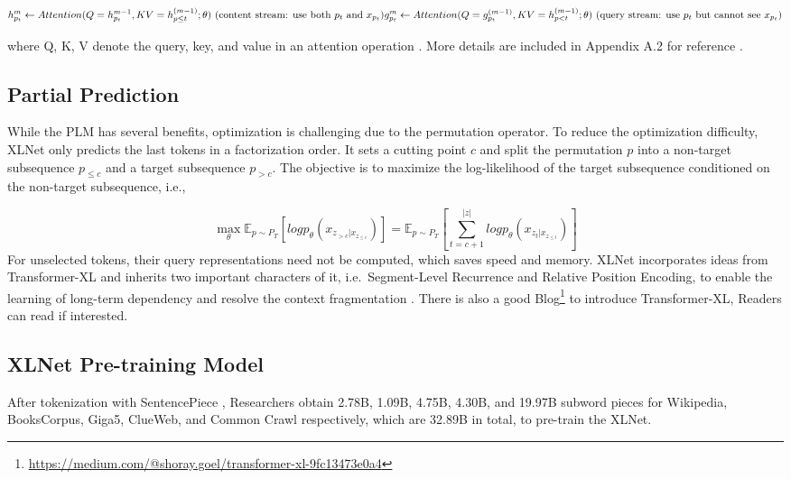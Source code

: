 \documentclass[]{krantz}
\renewcommand{\href}[2]{#2\footnote{\url{#1}}}
\begin{document}
\[
h_{p_t}^{m} \leftarrow Attention (Q=h_{p_t}^{m-1}, KV=h^{(m-1)}_{p \leq t};\theta)
\text{  (content stream: use both $p_t$ and $x_{p_t}$)}
\\
g_{p_t}^{m}\leftarrow Attention (Q=g_{p_t}^{(m-1)}, KV=h^{(m-1)}_{p<t};\theta)
\text{  (query stream: use $p_t$ but cannot see }x_{p_t})
\]

where Q, K, V denote the query, key, and value in an attention operation \citet{vaswani2017attention}.
More details are included in Appendix A.2 for reference \citet{yang2019xlnet}.

\hypertarget{partial-prediction}{%
\subsection{Partial Prediction}\label{partial-prediction}}

While the PLM has several benefits, optimization is challenging due to the permutation operator. To reduce the optimization difficulty, XLNet only predicts the last tokens in a factorization order. It sets a cutting point \(c\) and split the permutation \(p\) into a non-target subsequence \(p_{\leq c}\) and a target subsequence \(p_{>c}\). The objective is to maximize the log-likelihood of the target subsequence conditioned on the non-target subsequence, i.e.,

\begin{equation}
\max_{\theta}   \mathbb{E}_{p\sim P_T} \left[logp_{\theta}(x_{z_{>c}|x_{z_{\leq c}}})\right] =
\mathbb{E}_{p\sim P_T} \left[\sum_{t=c+1}^{|z|} logp_{\theta}(x_{z_t|x_{z_{\leq t}}})\right]
\end{equation}
For unselected tokens, their query representations need not be computed, which saves speed and memory. XLNet incorporates ideas from Transformer-XL and inherits two important characters of it, i.e.~Segment-Level Recurrence and Relative Position Encoding, to enable the learning of long-term dependency and resolve the context fragmentation \citet{dai2019transformer}. There is also a good \href{https://medium.com/@shoray.goel/transformer-xl-9fc13473e0a4}{Blog} to introduce Transformer-XL, Readers can read if interested.

\hypertarget{xlnet-pre-training-model}{%
\subsection{XLNet Pre-training Model}\label{xlnet-pre-training-model}}

After tokenization with SentencePiece \citet{kudo2018sentencepiece}, Researchers obtain 2.78B, 1.09B, 4.75B, 4.30B, and 19.97B subword pieces for Wikipedia, BooksCorpus, Giga5, ClueWeb, and Common Crawl respectively, which are 32.89B in total, to pre-train the XLNet.
\end{document}
